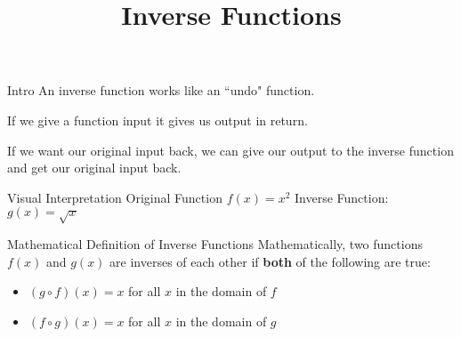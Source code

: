 \documentclass[t,usenames,dvipsnames]{beamer}
\title{Inverse Functions}
\author{}
\date{}
\begin{document}
\begin{frame}
    \maketitle
\end{frame}

\begin{frame}{Intro}
An inverse function works like an ``undo" function. \newline\\ \pause

If we give a function input it gives us output in return. \newline\\ \pause 

If we want our original input back, we can give our output to the inverse function and get our original input back.
\end{frame}

\begin{frame}{Visual Interpretation}
Original Function $f(x) = x^2$ \qquad Inverse Function: $g(x) = \sqrt{x}$ \newline\\
\begin{center}
\end{center}
\end{frame}

\begin{frame}{Mathematical Definition of Inverse Functions}
Mathematically, two functions $f(x)$ and $g(x)$ are inverses of each other if {\color{blue}\textbf{both}} of the following are true: \newline\\   \pause

\begin{itemize}
    \item $(g \circ f)(x) = x$ for all $x$ in the domain of $f$ \newline\\  \pause
    \item $(f \circ g)(x) = x$ for all $x$ in the domain of $g$   
\end{itemize}
\end{frame}
\end{document}
